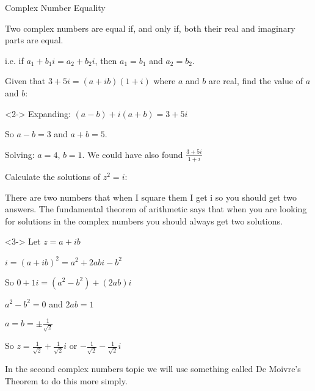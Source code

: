 \documentclass{beamer}
\begin{document}
	\begin{frame}[shrink=15]{Complex Number Equality}
	    \begin{definition}
	        Two complex numbers are equal if, and only if, both their real and imaginary parts are equal.
	        
	        i.e. if $a_1+b_1i = a_2+b_2i$, then $a_1=b_1$ and $a_2=b_2$.
	    \end{definition}
	    
	    \begin{problem}
	        Given that $3+5i=(a+ib)(1+i)$ where $a$ and $b$ are real, find the value of $a$ and $b$:
	    \end{problem}
	    
	    \begin{solution}<2->
	        Expanding: $(a-b)+i(a+b)=3+5i$
	        
            So $a-b=3$ and $a+b=5$.
            
            Solving: $a=4$, $b=1$. We could have also found $\frac{3+5i}{1+i}$
	    \end{solution}
	    
	    \begin{problem}
	        Calculate the solutions of $z^2=i$:
	    \end{problem}
	    
        \alert<1>{There are two numbers that when I square them I get i so you should get two answers. The fundamental theorem of arithmetic says that when you are looking for solutions in the complex numbers you should always get two solutions.}
    
	    \begin{solution}<3->
	        Let $z=a+ib$
	        
            $i=(a+ib)^2=a^2+2abi-b^2$
            
            So $0+1i=(a^2-b^2 )+(2ab)i $
            
            $a^2-b^2=0$ and $2ab=1$
            
            $a=b=\pm \frac{1}{\sqrt{2}}$
            
            So $z=\frac{1}{\sqrt{2}}+\frac{1}{\sqrt{2}}i$ or $-\frac{1}{\sqrt{2}}-\frac{1}{\sqrt{2}}i$
	    \end{solution}
	    
	    \alert<1>{In the second complex numbers topic we will use something called De Moivre’s Theorem to do this more simply.}
	\end{frame}
	
\end{document}
